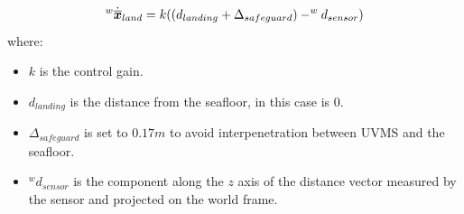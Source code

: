 \documentclass{article}
\begin{document}
\begin{equation}
\large
    ^{w}\dot{\overline{\boldsymbol{x}}}_{land} = k((d_{landing} + \Delta_{safeguard}) - ^w d_{sensor}) %
\end{equation}
where:
\begin{itemize}
    \item $k$ is the control gain.
    \item $d_{landing}$ is the distance from the seafloor, in this case is $0$.
    \item $\Delta_{safeguard}$ is set to $0.17m$  to avoid interpenetration between UVMS and the seafloor.
    \item $^w d_{sensor}$ is the component along the $z$ axis of the distance vector measured by the sensor and projected on the world frame.
\end{itemize} 

\end{document}
